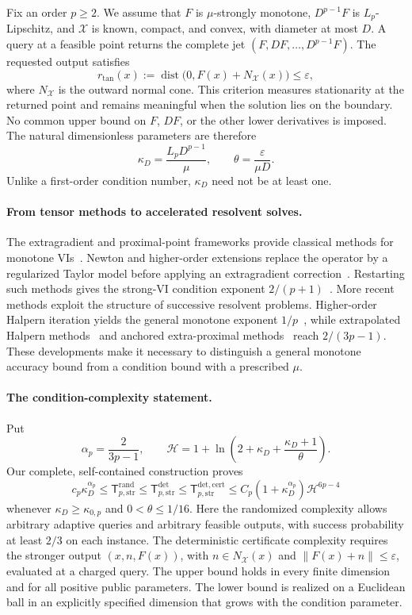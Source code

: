 \documentclass[11pt]{article}
\numberwithin{equation}{section}
\theoremstyle{definition}
\theoremstyle{remark}
\newcommand{\Tdet}{\mathsf T_{p,\mathrm{str}}^{\mathrm{det}}}
\newcommand{\Trand}{\mathsf T_{p,\mathrm{str}}^{\mathrm{rand}}}
\newcommand{\Tcert}{\mathsf T_{p,\mathrm{str}}^{\mathrm{det,cert}}}
\newcommand{\ap}{\alpha_p}
\begin{document}
Fix an order $p\ge2$. We assume that $F$ is $\mu$-strongly monotone,
$D^{p-1}F$ is $L_p$-Lipschitz, and $\mathcal X$ is known, compact, and
convex, with diameter at most $D$. A query at a feasible point returns the
complete jet $(F,DF,\ldots,D^{p-1}F)$. The requested output satisfies
\begin{equation}\label{eq:intro-residual}
r_{\mathrm{tan}}(x)
:=\operatorname{dist}\bigl(0,F(x)+N_{\mathcal X}(x)\bigr)
\le\varepsilon,
\end{equation}
where $N_{\mathcal X}$ is the outward normal cone. This criterion measures
stationarity at the returned point and remains meaningful when the
solution lies on the boundary. No common upper bound on $F$, $DF$, or the
other lower derivatives is imposed. The natural dimensionless parameters
are therefore
\[
\kappa_D=\frac{L_pD^{p-1}}{\mu},\qquad
\theta=\frac{\varepsilon}{\mu D}.
\]
Unlike a first-order condition number, $\kappa_D$ need not be at least one.

\paragraph{From tensor methods to accelerated resolvent solves.}
The extragradient and proximal-point frameworks provide classical methods
for monotone VIs~\cite{korpelevich1976,rockafellar1976,nemirovski2004}.
Newton and higher-order extensions replace the operator by a regularized
Taylor model before applying an extragradient
correction~\cite{monteiro2012,bullins2020,adil2022,lin2024}.
Restarting such methods gives the strong-VI condition exponent
$2/(p+1)$~\cite{ostroukhov2020}. More recent methods exploit the structure
of successive resolvent problems. Higher-order Halpern iteration yields
the general monotone exponent $1/p$~\cite{chen2026halpern}, while
extrapolated Halpern methods~\cite{zhang2026,zhangchen2026} and anchored
extra-proximal methods~\cite{jiangyoon2026} reach $2/(3p-1)$.
These developments make it necessary to distinguish a general monotone
accuracy bound from a condition bound with a prescribed $\mu$.

\paragraph{The condition-complexity statement.}
Put
\[
\ap=\frac{2}{3p-1},\qquad
\mathcal H=1+\ln\!\left(2+\kappa_D+
\frac{\kappa_D+1}{\theta}\right).
\]
Our complete, self-contained construction proves
\begin{equation}\label{eq:intro-frontier}
c_p\kappa_D^{\ap}
\le\Trand\le\Tdet\le\Tcert
\le C_p(1+\kappa_D^{\ap})\mathcal H^{6p-4}
\end{equation}
whenever $\kappa_D\ge\kappa_{0,p}$ and $0<\theta\le1/16$.
Here the randomized complexity allows arbitrary adaptive queries and
arbitrary feasible outputs, with success probability at least $2/3$ on
each instance. The deterministic certificate complexity requires the
stronger output $(x,n,F(x))$, with $n\in N_{\mathcal X}(x)$ and
$\|F(x)+n\|\le\varepsilon$, evaluated at a charged query. The upper
bound holds in every finite dimension and for all positive public
parameters. The lower bound is realized on a Euclidean ball in an
explicitly specified dimension that grows with the condition parameter.
\end{document}
